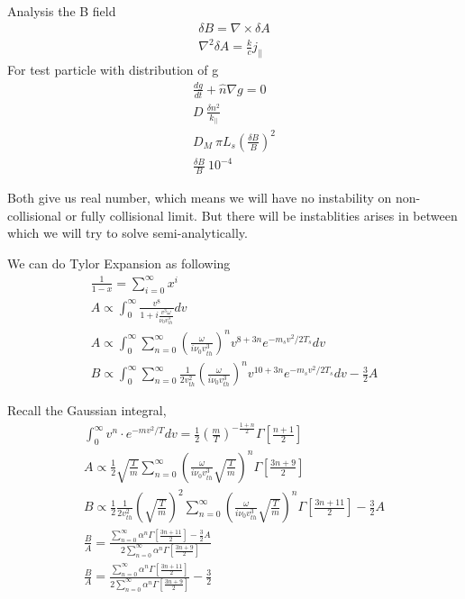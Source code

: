 Analysis the B field
\begin{eqnarray}
     \delta B=\nabla \times \delta A\\
     \nabla ^2 \delta A= \frac{k}{c} j_{||}
\end{eqnarray}
For test particle with distribution of g\\
\begin{eqnarray}
     \frac{dg}{dt} + \hat{n} \nabla g=0\\
     D~\frac{\delta n^2}{k_{||}}\\
     D_M~ \pi L_s(\frac{\delta B}{B})^2\\
     \frac{\delta B}{B}~10^{-4}
\end{eqnarray}

Both give us real number, which means we will have no instability on non-collisional or fully collisional limit. But there will be instablities arises in between which we will try to solve semi-analytically. 

We can do Tylor Expansion as following
\begin{eqnarray}
     \frac{1}{1-x}=\sum^\infty_{i=0} x^i\\
     A \propto \int ^\infty _0 \frac{v^8}{1+i\frac{v^3\omega}{\nu_0v_{th}^3}}dv\\
     A \propto \int ^{\infty}_0 \sum^\infty_{n=0} (\frac{\omega}{i\nu_0 v_{th}^3})
     ^nv^{8+3n}e^{-m_sv^2/2T_s}dv\\
     B \propto \int ^{\infty}_0 \sum^\infty_{n=0} \frac{1}{2v^2_{th}}(\frac{\omega}{i\nu_0 v_{th}^3})
     ^nv^{10+3n}e^{-m_sv^2/2T_s}dv-\frac{3}{2}A
\end{eqnarray}

Recall the Gaussian integral, 
\begin{eqnarray}
     \int ^{\infty}_0 v^n\cdot e^{-mv^2/T}dv=\frac{1}{2} (\frac{m}{T})^{-\frac{1+n}{2}} \Gamma[\frac{n+1}{2}]\\
     A \propto \frac{1}{2} \sqrt{\frac{T}{m}} \sum^\infty_{n=0} (\frac{\omega}{i\nu_0 v_{th}^3}\sqrt{\frac{T}{m}})
     ^{n}   \Gamma[\frac{3n+9}{2}]\\
     B \propto \frac{1}{2} \frac{1}{2v^2_{th}} (\sqrt{\frac{T}{m}})^2 \sum^\infty_{n=0} (\frac{\omega}{i\nu_0 v_{th}^3}\sqrt{\frac{T}{m}})
     ^{n}   \Gamma[\frac{3n+11}{2}]
     -\frac{3}{2}A\\
     \frac{B}{A}=\frac{\sum^\infty_{n=0} \alpha
     ^{n}  \Gamma[\frac{3n+11}{2}]
     -\frac{3}{2}A
     }
     {2\sum^\infty_{n=0} \alpha
     ^{n}  \Gamma[\frac{3n+9}{2}]}\\
     \frac{B}{A}=\frac{\sum^\infty_{n=0} \alpha
     ^{n}  \Gamma[\frac{3n+11}{2}]
     }
     {2\sum^\infty_{n=0} \alpha
     ^{n}  \Gamma[\frac{3n+9}{2}]}-\frac{3}{2}
\end{eqnarray}

